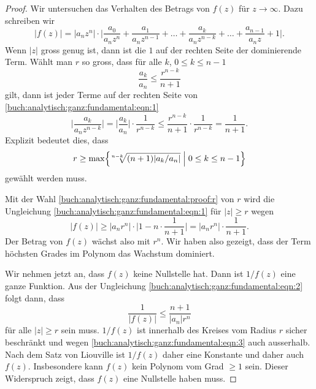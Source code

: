 \begin{proof}
Wir untersuchen das Verhalten des Betrags von $f(z)$ für $z\to\infty$.
Dazu schreiben wir
\begin{equation}
|f(z)|
= 
|a_nz^n|
\cdot
\biggl|
\frac{a_0}{a_nz^n}
+
\frac{a_1}{a_nz^{n-1}}
+
\ldots
+
\frac{a_k}{a_nz^{n-k}}
+
\ldots
+
\frac{a_{n-1}}{a_nz}
+
1
\biggr|.
\label{buch:analytisch:ganz:fundamental:eqn:1}
\end{equation}
Wenn $|z|$ gross genug ist, dann ist die $1$ auf der rechten Seite
der dominierende Term.
Wählt man $r$ so gross, dass für alle $k$, $0\le k\le n-1$
\begin{equation}
\frac{a_k}{a_n}
\le
\frac{r^{n-k}}{n+1}
\label{buch:analytisch:ganz:fundamental:proof:2}
\end{equation}
gilt, dann ist jeder Terme auf der rechten Seite von
\eqref{buch:analytisch:ganz:fundamental:eqn:1}
\[
\biggl|
\frac{a_k}{a_nz^{n-k}}
\biggr|
=
\biggl|
\frac{a_k}{a_n}
\biggr|
\cdot
\frac{1}{r^{n-k}}
\le
\frac{r^{n-k}}{n+1}
\cdot
\frac{1}{r^{n-k}}
=
\frac{1}{n+1}.
\]
Explizit bedeutet dies, dass 
\begin{equation}
r\ge
\max
\Bigl\{
\!\sqrt[n-k]{(n+1)|a_k/a_n|}
\;
\Big|
\;
0\le k\le n-1
\Bigr\}
\label{buch:analytisch:ganz:fundamental:proof:r}
\end{equation}
gewählt werden muss.

Mit der Wahl \eqref{buch:analytisch:ganz:fundamental:proof:r}
von $r$ wird die Ungleichung
\eqref{buch:analytisch:ganz:fundamental:eqn:1}
für $|z|\ge r$
wegen
\label{buch:analytisch:ganz:fundamental:proof:2}
\begin{equation}
|f(z)|
\ge
|a_nr^n|
\cdot
\biggl|
1
-
n
\cdot
\frac{1}{n+1}
\biggr|
=
|a_nr^n|
\cdot
\frac{1}{n+1}.
\label{buch:analytisch:ganz:fundamental:eqn:2}
\end{equation}
Der Betrag von $f(z)$ wächst also mit $r^n$.
Wir haben also gezeigt, dass der Term höchsten Grades im Polynom
das Wachstum dominiert.

Wir nehmen jetzt an, dass $f(z)$ keine Nullstelle hat.
Dann ist $1/f(z)$ eine ganze Funktion.
Aus der Ungleichung
\eqref{buch:analytisch:ganz:fundamental:eqn:2}
folgt dann, dass
\begin{equation}
\frac{1}{|f(z)|}
\le
\frac{n+1}{ |a_n| r^n }
\label{buch:analytisch:ganz:fundamental:eqn:3}
\end{equation}
für alle $|z|\ge r$ sein muss.
$1/f(z)$ ist innerhalb des Kreises vom Radius $r$ sicher beschränkt
und wegen
\eqref{buch:analytisch:ganz:fundamental:eqn:3}
auch ausserhalb.
Nach dem Satz von Liouville ist $1/f(z)$ daher eine Konstante und
daher auch $f(z)$.
Insbesondere kann $f(z)$ kein Polynom vom Grad $\ge 1$ sein.
Dieser Widerspruch zeigt, dass $f(z)$ eine Nullstelle haben muss.
\end{proof}

